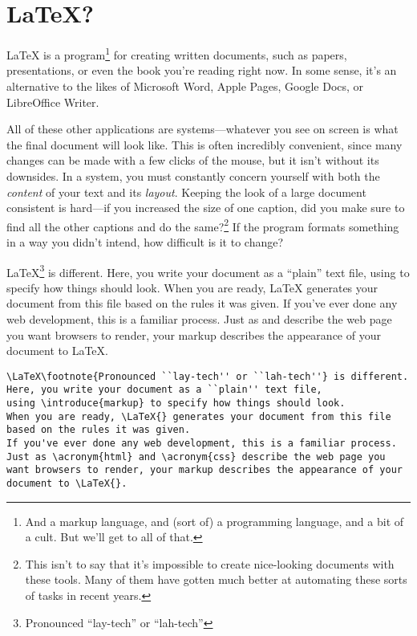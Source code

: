 \chapter{\texorpdfstring{\LaTeX}{LaTeX}?}

\LaTeX{} is a program\footnote{And a markup language,
and (sort of) a programming language, and a bit of a cult.
But we'll get to all of that.}
for creating written documents, such as papers, presentations,
or even the book you're reading right now.
In some sense, it's an alternative to the likes of Microsoft Word,
Apple Pages, Google Docs, or LibreOffice Writer.

All of these other applications are
  systems---whatever
you see on screen is what the final document will look like.
This is often incredibly convenient, since many changes can be made
with a few clicks of the mouse,
but it isn't without its downsides.
In a  system,
you must constantly concern yourself with both
the \emph{content} of your text and its \emph{layout}.
Keeping the look of a large document consistent is hard---if you increased
the size of one caption, did you make sure to find all the other
captions and do the same?\footnote{This isn't to say that it's impossible
to create nice-looking documents with these tools.
Many of them have gotten much better at automating these sorts of
tasks in recent years.}
If the program formats something in a way you didn't intend,
how difficult is it to change?%

\LaTeX\footnote{Pronounced ``lay-tech'' or ``lah-tech''} is different.
Here, you write your document as a ``plain'' text file,
using  to specify how things should look.
When you are ready, \LaTeX{} generates your document from this file
based on the rules it was given.
If you've ever done any web development, this is a familiar process.
Just as  and  describe the web page you
want browsers to render, your markup describes the appearance of your
document to \LaTeX{}.

\begin{leftfigure}
\begin{lstlisting}
\LaTeX\footnote{Pronounced ``lay-tech'' or ``lah-tech''} is different.
Here, you write your document as a ``plain'' text file,
using \introduce{markup} to specify how things should look.
When you are ready, \LaTeX{} generates your document from this file
based on the rules it was given.
If you've ever done any web development, this is a familiar process.
Just as \acronym{html} and \acronym{css} describe the web page you
want browsers to render, your markup describes the appearance of your
document to \LaTeX{}.
\end{lstlisting}
\end{leftfigure}

